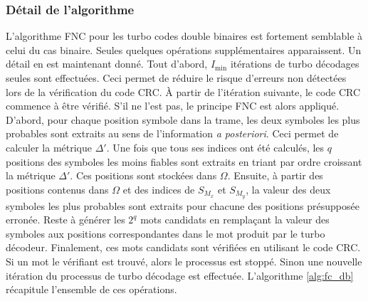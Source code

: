 \subsubsection{Détail de l'algorithme}
L'algorithme FNC pour les turbo codes double binaires est fortement semblable à celui du cas binaire. Seules quelques 
opérations supplémentaires apparaissent. Un détail en est maintenant donné. Tout d'abord, $I_{\text{min}}$ itérations de 
turbo décodages seules sont effectuées. Ceci permet de réduire le risque d'erreurs non détectées lors de la vérification 
du code CRC. À partir de l'itération suivante, le code CRC commence à être vérifié. S'il ne l'est pas, le principe FNC
est alors appliqué. D'abord, pour chaque position symbole dans la trame, les deux symboles les plus probables sont 
extraits au sens de l'information \textit{a posteriori}. Ceci permet de calculer la métrique $\Delta'$. Une fois que 
tous ses indices ont été calculés, les $q$ positions des symboles les moins fiables sont extraits en triant par ordre 
croissant la métrique $\Delta'$. Ces positions sont stockées dans $\Omega$. Ensuite, à partir des positions contenus dans
$\Omega$ et des indices de $S_{M_x}$ et $S_{M_y}$, la valeur des deux symboles les plus probables sont extraits pour 
chacune des positions présupposée erronée. Reste à générer les $2^q$ mots candidats en remplaçant la valeur des symboles
aux positions correspondantes dans le mot produit par le turbo décodeur. Finalement, ces mots candidats sont vérifiées
en utilisant le code CRC. Si un mot le vérifiant est trouvé, alors le processus est stoppé. Sinon une nouvelle itération
du processus de turbo décodage est effectuée. L'algorithme \ref{alg:fc_db} récapitule l'ensemble de ces opérations.

